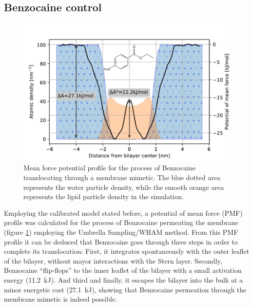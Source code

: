 \documentclass[twoside,twocolumn,9pt]{article}
\begin{document}
\subsection{Benzocaine control}
\label{sec:benzo}

\begin{figure}[htb]
  \centering
  \includegraphics[width=\columnwidth]{benzo_profile_density}
  \caption{Mean force potential profile for the process of Benzocaine
    translocating through a membrane mimetic. The blue dotted area represents
    the water particle density, while the smooth orange area represents the
    lipid particle density in the simulation.}
  \label{fig:benzocaine_profile}
\end{figure}
Employing the calibrated model stated before, a potential of mean force (PMF)
profile was calculated for the process of Benzocaine permeating the membrane
(figure \ref{fig:benzocaine_profile}) employing the Umbrella
Sampling/WHAM\cite{Kumar1992} method. From this PMF profile it can be
deduced that Benzocaine goes through three steps in order to complete its
translocation: First, it integrates spontaneously with the outer leaflet of the
bilayer, without mayor interactions with the Stern layer. Secondly, Benzocaine
``flip-flops'' to the inner leaflet of the bilayer with a small activation
energy (\SI{11.2}{\kilo\joule}). And third and finally, it escapes the bilayer
into the
bulk at a minor energetic cost (\SI{27.1}{kJ}), showing that Benzocaine
permeation through the membrane mimetic is indeed possible.\\
\end{document}
